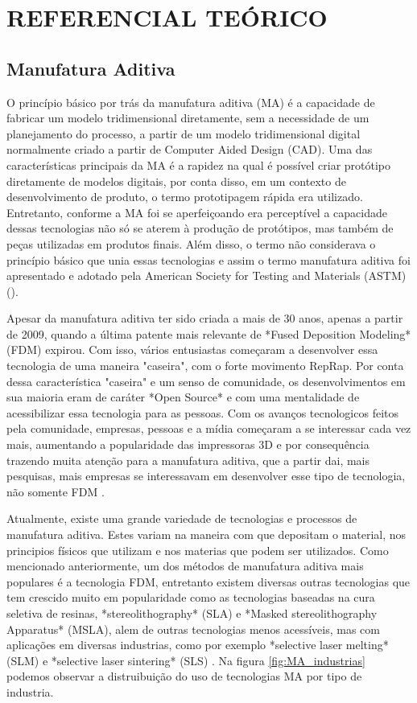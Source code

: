 \chapter{REFERENCIAL TEÓRICO}

\section{Manufatura Aditiva}
O princípio básico por trás da manufatura aditiva (MA) é a 
capacidade de fabricar um modelo tridimensional diretamente, 
sem a necessidade de um planejamento do processo, a partir de 
um modelo tridimensional digital normalmente criado a partir 
de Computer Aided Design (CAD). Uma das características 
principais da MA é a rapidez na qual é possível criar protótipo
diretamente de modelos digitais, por conta disso, em um contexto 
de desenvolvimento de produto, o termo prototipagem rápida era 
utilizado. Entretanto, conforme a MA foi se aperfeiçoando era 
perceptível a capacidade dessas tecnologias não só se aterem à 
produção de protótipos, mas também de peças utilizadas em 
produtos finais. Além disso, o termo não considerava o princípio 
básico que unia essas tecnologias e assim o termo manufatura 
aditiva foi apresentado e adotado pela American Society for 
Testing and Materials (ASTM) \citeauthor{gibson15} (\citeyear{gibson15}).

Apesar da manufatura aditiva ter sido criada a mais de 30 anos, apenas
a partir de 2009, quando a última patente mais relevante de *Fused Deposition Modeling* (FDM)
expirou. Com isso, vários entusiastas começaram a desenvolver essa tecnologia de uma
maneira "caseira", com o forte movimento RepRap. Por conta dessa característica
"caseira" e um senso de comunidade, os desenvolvimentos em sua maioria eram
de caráter *Open Source* e com uma mentalidade de acessibilizar essa tecnologia para as pessoas.
Com os avanços tecnologicos feitos pela comunidade, empresas, pessoas e a mídia começaram
a se interessar cada vez mais, aumentando a popularidade das impressoras 3D e por consequência
trazendo muita atenção para a manufatura aditiva, que a partir dai, mais pesquisas, mais
empresas se interessavam em desenvolver esse tipo de tecnologia, não somente FDM \cite{attaran17}.

Atualmente, existe uma grande variedade de tecnologias e processos de manufatura aditiva.
Estes variam na maneira com que depositam o material, nos principios físicos que utilizam e nos materias
que podem ser utilizados. Como mencionado anteriormente, um dos métodos de manufatura aditiva mais populares
é a tecnologia FDM, entretanto existem diversas outras tecnologias que tem crescido muito em popularidade
como as tecnologias baseadas na cura seletiva de resinas, *stereolithography* (SLA) e *Masked stereolithography Apparatus* (MSLA),
alem de outras tecnologias menos acessíveis, mas com aplicações em diversas industrias, como por exemplo
*selective laser melting* (SLM) e *selective laser sintering* (SLS) \cite{bikas16}.
Na figura \ref{fig:MA_industrias} podemos observar a distruibuição do uso de 
tecnologias MA por tipo de industria.   

